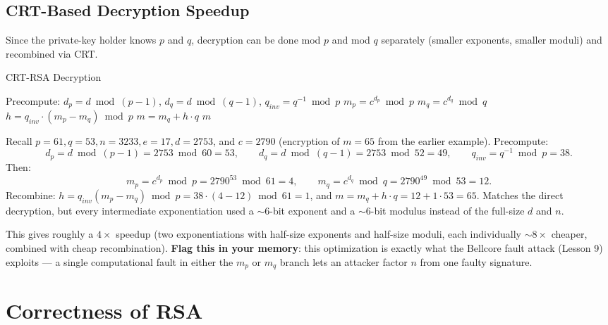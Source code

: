 \subsection{CRT-Based Decryption Speedup}\label{sec:crt-speedup}

Since the private-key holder knows $p$ and $q$, decryption can be done mod $p$ and mod $q$ separately (smaller exponents, smaller moduli) and recombined via CRT.

\begin{algorithm}[h]
\caption{CRT-RSA Decryption}
\begin{algorithmic}[1]
\State Precompute: $d_p = d \bmod (p-1)$, \quad $d_q = d \bmod (q-1)$, \quad $q_{inv} = q^{-1} \bmod p$
\State $m_p = c^{d_p} \bmod p$
\State $m_q = c^{d_q} \bmod q$
\State $h = q_{inv} \cdot (m_p - m_q) \bmod p$
\State $m = m_q + h \cdot q$
\State \Return $m$
\end{algorithmic}
\end{algorithm}

\begin{example}
Recall $p=61, q=53, n=3233, e=17, d=2753$, and $c = 2790$ (encryption of $m=65$ from the earlier example). Precompute:
\[
d_p = d \bmod (p-1) = 2753 \bmod 60 = 53, \qquad d_q = d \bmod (q-1) = 2753 \bmod 52 = 49, \qquad q_{inv} = q^{-1} \bmod p = 38.
\]
Then:
\[
m_p = c^{d_p} \bmod p = 2790^{53} \bmod 61 = 4, \qquad m_q = c^{d_q} \bmod q = 2790^{49} \bmod 53 = 12.
\]
Recombine: $h = q_{inv}(m_p - m_q) \bmod p = 38 \cdot (4-12) \bmod 61 = 1$, and $m = m_q + h \cdot q = 12 + 1 \cdot 53 = 65$. \checkmark Matches the direct decryption, but every intermediate exponentiation used a $\sim$6-bit exponent and a $\sim$6-bit modulus instead of the full-size $d$ and $n$.
\end{example}

This gives roughly a $4\times$ speedup (two exponentiations with half-size exponents and half-size moduli, each individually $\sim 8\times$ cheaper, combined with cheap recombination). \textbf{Flag this in your memory}: this optimization is exactly what the Bellcore fault attack (Lesson 9) exploits — a single computational fault in either the $m_p$ or $m_q$ branch lets an attacker factor $n$ from one faulty signature.

\newpage
\section{Correctness of RSA}\label{sec:correctness}

